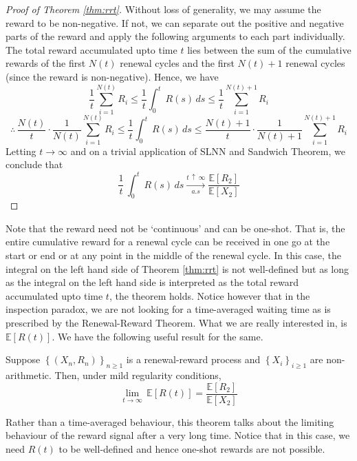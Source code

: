 \documentclass[12pt]{article}
\theoremstyle{definition}
\begin{document}
\begin{proof}[Proof of Theorem \ref{thm:rrt}]
    Without loss of generality, we may assume the reward to be non-negative. If not, we can separate out the positive and negative parts of the reward and apply the following arguments to each part individually. The total reward accumulated upto time $t$ lies between the sum of the cumulative rewards of the first $N(t)$ renewal cycles and the first $N(t)+1$ renewal cycles (since the reward is non-negative). Hence, we have
    \[
        \frac{1}{t} \sum_{i=1}^{N(t)} R_i \leq \frac{1}{t} \int_0^t \, R(s) \, ds \leq \frac{1}{t} \sum_{i=1}^{N(t)+1} R_i
    \]
    \[
        \therefore \, \frac{N(t)}{t} \cdot \frac{1}{N(t)} \sum_{i=1}^{N(t)} R_i \leq \frac{1}{t} \int_0^t \, R(s) \, ds \leq \frac{N(t)+1}{t} \cdot \frac{1}{N(t)+1} \sum_{i=1}^{N(t)+1} R_i
    \]
    Letting $t \to \infty$ and on a trivial application of SLNN and Sandwich Theorem, we conclude that
    \[
        \frac{1}{t} \, \int_0^t \, R(s) \, ds \xrightarrow[a.s]{t \, \uparrow \, \infty} \frac{\mathbb{E}[R_2]}{\mathbb{E}[X_2]}
    \]
\end{proof}

Note that the reward need not be `continuous' and can be one-shot. That is, the entire cumulative reward for a renewal cycle can be received in one go at the start or end or at any point in the middle of the renewal cycle. In this case, the integral on the left hand side of Theorem \ref{thm:rrt} is not well-defined but as long as the integral on the left hand side is interpreted as the total reward accumulated upto time $t$, the theorem holds. Notice however that in the inspection paradox, we are not looking for a time-averaged waiting time as is prescribed by the Renewal-Reward Theorem. What we are really interested in, is $\mathbb{E}[R(t)]$. We have the following useful result for the same. 

\begin{thm} \label{thm:rrt_2}
    Suppose $\left\{ (X_n, R_n) \right\}_{n \geq 1}$ is a renewal-reward process and $\left\{ X_i \right\}_{i \geq 1}$ are non-arithmetic. Then, under mild regularity conditions, 
    \[
        \lim_{t \to \infty} \, \mathbb{E} \left[ R(t) \right] = \frac{\mathbb{E}[R_2]}{\mathbb{E}[X_2]}
    \]
\end{thm}

Rather than a time-averaged behaviour, this theorem talks about the limiting behaviour of the reward signal after a very long time. Notice that in this case, we need $R(t)$ to be well-defined and hence one-shot rewards are not possible.
\end{document}
